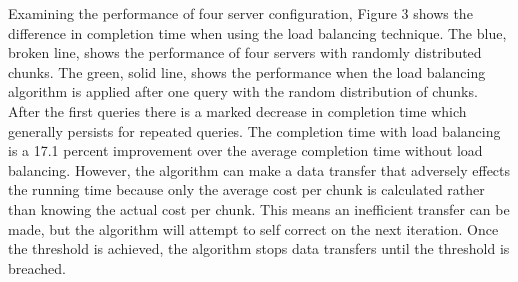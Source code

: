 \documentclass{article}
\newenvironment{Figure}
               {\par\medskip\noindent\minipage{\linewidth}}
               {\endminipage\par\medskip}
\begin{document}
\begin{multicols}{2}
\begin{Figure}
  \centering
  \noindent{}
\end{Figure}

Examining the performance of four server configuration, Figure 3 shows the difference in completion time when using the load balancing technique.  The blue, broken line, shows the performance of four servers with randomly distributed chunks. The green, solid line, shows the performance when the load balancing algorithm is applied after one query with the random distribution of chunks.  After the first queries there is a marked decrease in completion time which generally persists for repeated queries.  The completion time with load balancing is a 17.1 percent improvement over the average completion time without load balancing.  However, the algorithm can make a data transfer that adversely effects the running time because only the average cost per chunk is calculated rather than knowing the actual cost per chunk. This means an inefficient transfer can be made, but the algorithm will attempt to self correct on the next iteration. Once the threshold is achieved, the algorithm stops data transfers until the threshold is breached.


\end{multicols}
\end{document}
